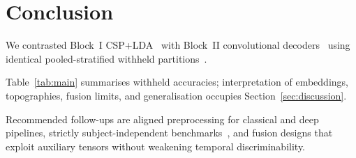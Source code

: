 \section{Conclusion}

We contrasted Block~I CSP+LDA~\cite{gramfort2013meg} with Block~II convolutional decoders~\cite{lawhern2018eegnet} using identical pooled-stratified withheld partitions~\cite{ofner2017upper}.

Table~\ref{tab:main} summarises withheld accuracies; interpretation of embeddings, topographies, fusion limits, and generalisation occupies Section~\ref{sec:discussion}.

Recommended follow-ups are aligned preprocessing for classical and deep pipelines, strictly subject-independent benchmarks~\cite{ofner2017upper}, and fusion designs that exploit auxiliary tensors without weakening temporal discriminability.
